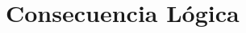 \documentclass[11pt,letterpaper]{article}
\begin{document}


\section{Consecuencia Lógica}
\end{document}
